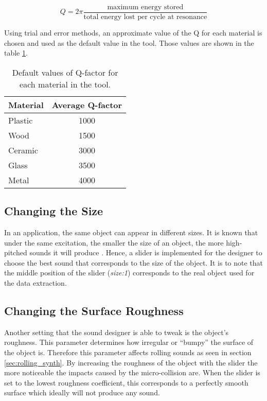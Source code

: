 \begin{equation}\label{eq:Qfactor}
Q=2\pi \frac{\mbox{maximum energy stored}}{\mbox{total energy lost per cycle at resonance}}
\end{equation}

Using trial and error methods, an approximate value of the \gls{Q} for each material is chosen and used as the default value in the tool. Those values are shown in the table \ref{tab:default_Q}.

\begin{table}[H]
	\centering
    \begin{tabular}{ l  c }
    \toprule
    \textbf{Material} & \textbf{Average Q-factor} \\
    \toprule 
    Plastic & 1000 \\ 
    Wood & 1500 \\ 
    Ceramic & 3000 \\ 
    Glass & 3500 \\ 
    Metal & 4000 \\
    \bottomrule
    \end{tabular}
    \caption{Default values of Q-factor for each material in the tool.}
    \label{tab:default_Q}
\end{table} 

\subsection{Changing the Size}
In an application, the same object can appear in different sizes. It is known that under the same excitation, the smaller the size of an object, the more high-pitched sounds it will produce \cite{gaver1993world}. Hence, a slider is implemented for the designer to choose the best sound that corresponds to the size of the object. It is to note that the middle position of the slider (\textit{size:1}) corresponds to the real object used for the data extraction.

\subsection{Changing the Surface Roughness}
Another setting that the sound designer is able to tweak is the object's roughness. This parameter determines how irregular or ``bumpy'' the surface of the object is. Therefore this parameter affects rolling sounds as seen in section \ref{sec:rolling_synth}. By increasing the roughness of the object with the slider the more noticeable the impacts caused by the micro-collision are. When the slider is set to the lowest roughness coefficient, this corresponds to a perfectly smooth surface which ideally will not produce any sound.


